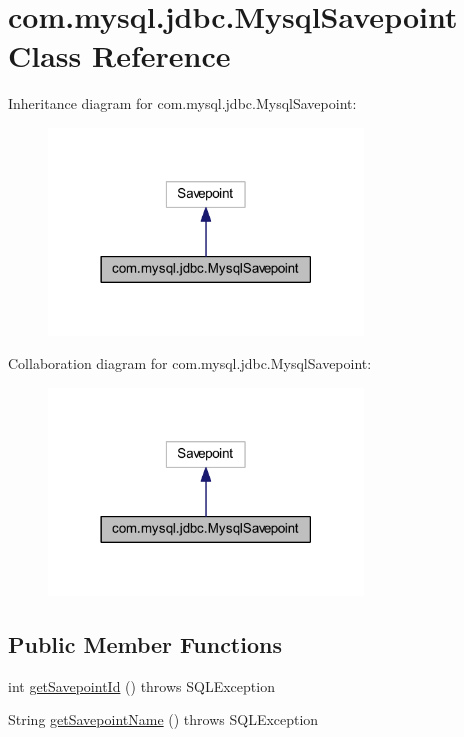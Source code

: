 \hypertarget{classcom_1_1mysql_1_1jdbc_1_1_mysql_savepoint}{}\section{com.\+mysql.\+jdbc.\+Mysql\+Savepoint Class Reference}
\label{classcom_1_1mysql_1_1jdbc_1_1_mysql_savepoint}


Inheritance diagram for com.\+mysql.\+jdbc.\+Mysql\+Savepoint\+:
\nopagebreak
\begin{figure}[H]
\begin{center}
\leavevmode
\includegraphics[width=237pt]{classcom_1_1mysql_1_1jdbc_1_1_mysql_savepoint__inherit__graph}
\end{center}
\end{figure}


Collaboration diagram for com.\+mysql.\+jdbc.\+Mysql\+Savepoint\+:
\nopagebreak
\begin{figure}[H]
\begin{center}
\leavevmode
\includegraphics[width=237pt]{classcom_1_1mysql_1_1jdbc_1_1_mysql_savepoint__coll__graph}
\end{center}
\end{figure}
\subsection*{Public Member Functions}
\begin{DoxyCompactItemize}
\item 
int \mbox{\hyperlink{classcom_1_1mysql_1_1jdbc_1_1_mysql_savepoint_abebfdcf4d5b67888ecec86230c7104cc}{get\+Savepoint\+Id}} ()  throws S\+Q\+L\+Exception 
\item 
String \mbox{\hyperlink{classcom_1_1mysql_1_1jdbc_1_1_mysql_savepoint_a78a27433692ef5fc878840e60172e91a}{get\+Savepoint\+Name}} ()  throws S\+Q\+L\+Exception 
\end{DoxyCompactItemize}


